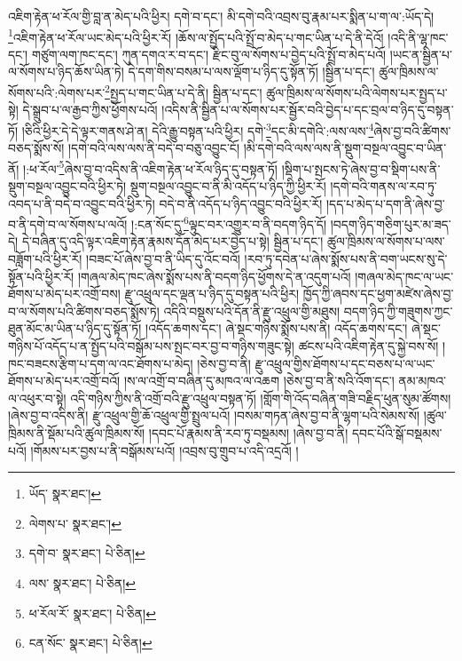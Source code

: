 འཇིག་རྟེན་ཕ་རོལ་གྱི་བླ་ན་མེད་པའི་ཕྱིར། དགེ་བ་དང་། མི་དགེ་བའི་འབྲས་བུ་རྣམ་པར་སྨིན་པ་ག་ལ་:ཡོད་དེ། \footnote{ཡོད་  སྣར་ཐང་། }འཇིག་རྟེན་ཕ་རོལ་ཡང་མེད་པའི་ཕྱིར་རོ། །ཆོས་ལ་སྤྱོད་པའི་སྤྲོ་བ་མེད་པ་གང་ཡིན་པ་དེ་ནི་དེའོ། །འདི་ནི་ལྷ་ཁང་དང་། གཙུག་ལག་ཁང་དང་། ཀུན་དགའ་ར་བ་དང་། རྫིང་བུ་ལ་སོགས་པ་བྱེད་པའི་སྤྲོ་བ་མེད་པའོ། །ཡང་ན་སྦྱིན་པ་ལ་སོགས་པ་ཉིད་ཆོས་ཡིན་ཏེ། དེ་དག་གིས་བསམ་པ་ལས་ལྡོག་པ་ཉིད་དུ་སྟོན་ཏོ། །སྦྱིན་པ་དང་། ཚུལ་ཁྲིམས་ལ་སོགས་པའི་:ལེགས་པར་\footnote{ལེགས་པ་  སྣར་ཐང་། }སྤྱད་པ་གང་ཡིན་པ་དེ་ནི། སྦྱིན་པ་དང་། ཚུལ་ཁྲིམས་ལ་སོགས་པའི་ལེགས་པར་སྤྱད་པ་སྟེ། དེ་སྒྲུབ་པ་ལ་རྒྱབ་ཀྱིས་ཕྱོགས་པའོ། །འདིས་ནི་སྦྱིན་པ་ལ་སོགས་པར་སྦྱོར་བའི་བྱེད་པ་དང་བྲལ་བ་ཉིད་དུ་བསྟན་ཏོ། །ཅིའི་ཕྱིར་དེ་དེ་ལྟར་གནས་ཤེ་ན། དེའི་རྒྱུ་བསྟན་པའི་ཕྱིར། དགེ་\footnote{དགེ་བ་  སྣར་ཐང་།  པེ་ཅིན། }དང་མི་དགེའི་:ལས་ལས་\footnote{ལས་  སྣར་ཐང་།  པེ་ཅིན། }ཞེས་བྱ་བའི་ཚིགས་བཅད་སྨོས་སོ། །དགེ་བའི་ལས་ལས་ནི་བདེ་བ་བཅུ་འབྱུང་ངོ། །མི་དགེ་བའི་ལས་ལས་ནི་སྡུག་བསྔལ་འབྱུང་བ་ཡིན་ནོ། །:ཕ་རོལ་\footnote{ཕ་རོལ་རོ་  སྣར་ཐང་།  པེ་ཅིན། }ཞེས་བྱ་བ་འདིས་ནི་འཇིག་རྟེན་ཕ་རོལ་ཉིད་དུ་བསྟན་ཏོ། །སྡིག་པ་སྤངས་ཏེ་ཞེས་བྱ་བ་སྡིག་པས་ནི་སྡུག་བསྔལ་འབྱུང་བའི་ཕྱིར་ཏེ། སྡུག་བསྔལ་འབྱུང་བ་ནི་མི་འདོད་པ་ཉིད་ཀྱི་ཕྱིར་རོ། །དགེ་བའི་གནས་ལ་རབ་ཏུ་འབད་པ་ནི་བདེ་བ་འབྱུང་བའི་ཕྱིར་ཏེ། བདེ་བ་ནི་འདོད་པ་ཉིད་འབྱུང་བའི་ཕྱིར་རོ། །དད་པ་མེད་པ་དག་ནི་ཞེས་བྱ་བ་ནི་དགེ་བ་ལ་སོགས་པ་ལའོ། །:ངན་སོང་དུ་\footnote{ངན་སོང་  སྣར་ཐང་།  པེ་ཅིན། }ལྟུང་བར་འགྱུར་བ་ནི་བདག་ཉིད་དོ། །བདག་ཉིད་གཅིག་པུར་མ་ཟད་དེ། དེ་བཞིན་དུ་འདི་ལྟར་འཇིག་རྟེན་རྣམས་དོན་མེད་པར་བྱེད་པ་སྟེ། སྦྱིན་པ་དང་། ཚུལ་ཁྲིམས་ལ་སོགས་པ་ལས་བཟློག་པའི་ཕྱིར་རོ། །བཟང་པོ་ཞེས་བྱ་བ་ནི་ཡིད་དུ་འོང་བའོ། །རབ་ཏུ་དབེན་པ་ཞེས་སྨོས་པས་ནི་བག་ཡངས་སུ་དེ་སྟོན་པའི་ཕྱིར་རོ། །གཞལ་མེད་ཁང་ཞེས་སྨོས་པས་ནི་བདག་ཉིད་ཕྱོགས་དེ་ན་འདུག་པའོ། །གཞལ་མེད་ཁང་ལ་ཡང་ཐོགས་པ་མེད་པར་འགྲོ་བས། རྫུ་འཕྲུལ་དང་ལྡན་པ་ཉིད་དུ་བསྟན་པའི་ཕྱིར། ཁྱོད་ཀྱི་ཞབས་དང་ཕྱག་མཛེས་ཞེས་བྱ་བ་ལ་སོགས་པའི་ཚིགས་བཅད་སྨོས་ཏེ། འདིའི་བསྡུས་པའི་དོན་ནི་རྫུ་འཕྲུལ་གྱི་མཐུས། བདག་ཉིད་ཀྱི་གཟུགས་ཀྱང་ཐུན་མོང་མ་ཡིན་པ་ཉིད་དུ་སྟོན་ཏོ། །འདོད་ཆགས་དང་། ཞེ་སྡང་གཉིས་སྨོས་པས་ནི། འདོད་ཆགས་དང་། ཞེ་སྡང་གཉིས་པོ་འདོད་པ་ན་སྤྱོད་པའི་བསྒོམ་པས་སྤང་བར་བྱ་བ་གཉིས་གཟུང་སྟེ། ཚངས་པའི་འཇིག་རྟེན་དུ་སྐྱེ་བས་སོ། །ཁང་བཟངས་རྩིག་པ་དག་ལ་འང་ཐོགས་པ་མེད། །ཅེས་བྱ་བ་ནི། རྫུ་འཕྲུལ་གྱིས་ཐོགས་པ་དང་བཅས་པ་ལ་ཡང་ཐོགས་པ་མེད་པར་འགྲོ་བའོ། །ས་ལ་འགྲོ་བ་བཞིན་དུ་མཁའ་ལ་འཆག །ཅེས་བྱ་བ་ནི་སའི་འོག་དང་། ནམ་མཁའ་ལ་འཕུར་བ་སྟེ། འདི་གཉིས་ཀྱིས་ནི་འགྲོ་བའི་རྫུ་འཕྲུལ་བསྟན་ཏོ། །གློག་གི་འོད་བཞིན་གཟི་བརྗིད་ཕུན་སུམ་ཚོགས། །ཞེས་བྱ་བ་འདིས་ནི། རྫུ་འཕྲུལ་གྱི་ཆོ་འཕྲུལ་གྱི་སྤྲུལ་པའོ། །བསམ་གཏན་ཞེས་བྱ་བ་ནི་ལྷག་པའི་སེམས་སོ། །ཚུལ་ཁྲིམས་ནི་སྡོམ་པའི་ཚུལ་ཁྲིམས་སོ། །དབང་པོ་རྣམས་ནི་རབ་ཏུ་བསྡམས། །ཞེས་བྱ་བ་ནི། དབང་པོའི་སྒོ་བསྡམས་པའོ། །གོམས་པར་བྱས་པ་ནི་བསྒོམས་པའོ། །འབྲས་བུ་གྲུབ་པ་འདི་འདྲའོ། །

